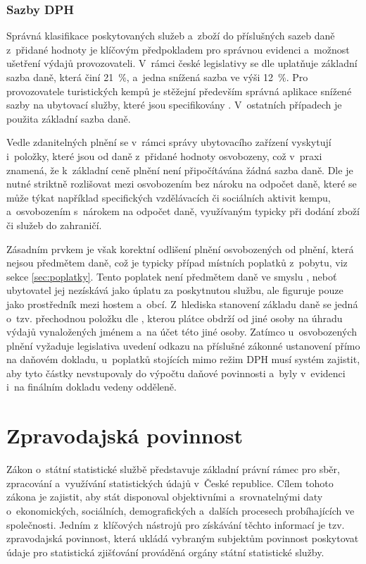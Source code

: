 \subsubsection{Sazby DPH}
\label{sec:sazba-dane}
Správná klasifikace poskytovaných služeb a~zboží do příslušných sazeb daně z~přidané hodnoty je klíčovým předpokladem pro správnou evidenci a~možnost ušetření výdajů provozovateli.
V~rámci české legislativy se dle \cite[\S~47]{cz-2004-235} uplatňuje základní sazba daně, která činí 21~\%, a~jedna snížená sazba ve výši 12~\%.
Pro provozovatele turistických kempů je stěžejní především správná aplikace snížené sazby na ubytovací služby, které jsou specifikovány \cite[příloha č. 2]{cz-2004-235}.
V~ostatních případech je použita základní sazba daně.

Vedle zdanitelných plnění se v~rámci správy ubytovacího zařízení vyskytují i~položky, které jsou od daně z~přidané hodnoty osvobozeny, což v~praxi znamená, že k~základní ceně plnění není připočítávána žádná sazba daně.
Dle \cite[\S~51 a~\S~63]{cz-2004-235} je nutné striktně rozlišovat mezi osvobozením bez nároku na odpočet daně, které se může týkat například specifických vzdělávacích či sociálních aktivit kempu, a~osvobozením s~nárokem na odpočet daně, využívaným typicky při dodání zboží či služeb do zahraničí.

Zásadním prvkem je však korektní odlišení plnění osvobozených od plnění, která nejsou předmětem daně, což je typicky případ místních poplatků z~pobytu, viz sekce \ref{sec:poplatky}.
Tento poplatek není předmětem daně ve smyslu \cite[\S~2]{cz-2004-235}, neboť ubytovatel jej nezískává jako úplatu za poskytnutou službu, ale figuruje pouze jako prostředník mezi hostem a~obcí.
Z~hlediska stanovení základu daně se jedná o~tzv. přechodnou položku dle \cite[\S~36 odst.~11]{cz-2004-235}, kterou plátce obdrží od jiné osoby na úhradu výdajů vynaložených jménem a~na účet této jiné osoby.
Zatímco u~osvobozených plnění vyžaduje legislativa uvedení odkazu na příslušné zákonné ustanovení přímo na daňovém dokladu, u~poplatků stojících mimo režim DPH musí systém zajistit, aby tyto částky nevstupovaly do výpočtu daňové povinnosti a~byly v~evidenci i~na finálním dokladu vedeny odděleně.

\section{Zpravodajská povinnost}
\label{sec:01-reports}
Zákon o~státní statistické službě \cite{cz-1995-89} představuje základní právní rámec pro sběr, zpracování a~využívání statistických údajů v~České republice.
Cílem tohoto zákona je zajistit, aby stát disponoval objektivními a~srovnatelnými daty o~ekonomických, sociálních, demografických a~dalších procesech probíhajících ve společnosti.
Jedním z~klíčových nástrojů pro získávání těchto informací je tzv. zpravodajská povinnost, která ukládá vybraným subjektům povinnost poskytovat údaje pro statistická zjišťování prováděná orgány státní statistické služby.


